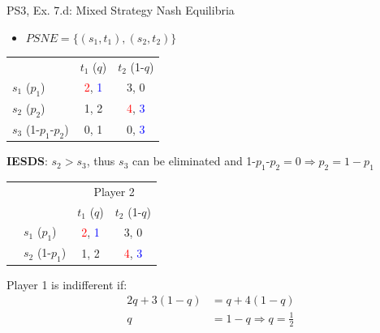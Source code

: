 \begin{frame}{PS3, Ex. 7.d: Mixed Strategy Nash Equilibria}
  \begin{multicols}{2}
    \begin{itemize}
      \item[(d)] $PSNE=\{(s_1,t_1),(s_2,t_2)\}$
    \end{itemize}
    \vspace{-8pt}
    \begin{table}
      \begin{tabular}{l|c|c|}
          \multicolumn{1}{c}{}  & \multicolumn{1}{c}{$t_1$ ($q$)} & \multicolumn{1}{c}{$t_2$ (1-$q$)} \\\cline{2-3}
          $s_1$ ($p_1$)         & \textcolor{red}{2}, \textcolor{blue}{1} & 3, 0 \\\cline{2-3}
          $s_2$ ($p_2$)         & 1, 2 & \textcolor{red}{4}, \textcolor{blue}{3} \\\cline{2-3}
          $s_3$ (1-$p_1$-$p_2$) & 0, 1 & 0, \textcolor{blue}{3} \\\cline{2-3}
      \end{tabular}
    \end{table}
    \vspace{-2pt}
    \textbf{IESDS}: $s_2>s_3$, thus $s_3$ can be eliminated and 1-$p_1$-$p_2=0\Rightarrow p_2=1-p_1$
    \vspace{-6pt}
    \begin{table}
      \begin{tabular}{cl|c|c|}
        & \multicolumn{1}{c}{} & \multicolumn{2}{c}{\color{blue}Player 2}\\
        \parbox[t]{1mm}{}
        &   &  &  \\
        & $s_1$ ($p_1$)  & \textcolor{red}{2}, \textcolor{blue}{1} & 3, 0 \\
        & $s_2$ (1-$p_1$)& 1, 2 & \textcolor{red}{4}, \textcolor{blue}{3} \\
      \end{tabular}
    \end{table}
    Player 1 is indifferent if:
    \begin{align*}
      2q+3(1-q) &= q+4(1-q) \\
      q &= 1-q \Rightarrow q = \frac{1}{2}
    \end{align*}
  \vfill\null \columnbreak
  \vfill\null
  \end{multicols}
\end{frame}
